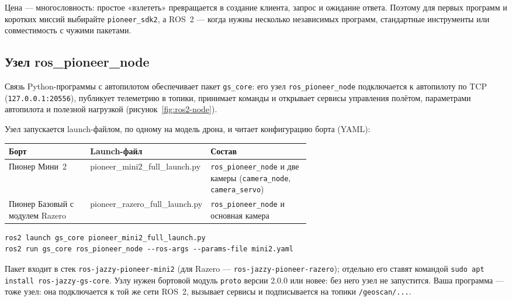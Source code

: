 Цена --- многословность: простое «взлететь» превращается в создание клиента, запрос и ожидание ответа. Поэтому для первых программ и коротких миссий выбирайте \texttt{pioneer\_sdk2}, а ROS~2 --- когда нужны несколько независимых программ, стандартные инструменты или совместимость с чужими пакетами.

\subsection{Узел ros\_pioneer\_node}

Связь Python-программы с автопилотом обеспечивает пакет \texttt{gs\_core}: его узел \texttt{ros\_pioneer\_node} подключается к автопилоту по TCP (\texttt{127.0.0.1:20556}), публикует телеметрию в топики, принимает команды и открывает сервисы управления полётом, параметрами автопилота и полезной нагрузкой (рисунок~\ref{fig:ros2-node}).



Узел запускается launch-файлом, по одному на модель дрона, и читает конфигурацию борта (YAML):

\begin{center}
\small
\begin{tabularx}{\linewidth}{@{}>{\raggedright\arraybackslash}p{0.27\linewidth} >{\ttfamily\raggedright\arraybackslash}p{0.33\linewidth} X@{}}
\toprule
\textrm{\textbf{Борт}} & \textrm{\textbf{Launch-файл}} & \textrm{\textbf{Состав}} \\
\midrule
\textrm{Пионер Мини~2} & pioneer\_mini2\_\allowbreak full\_launch.py & \textrm{\texttt{ros\_pioneer\_node} и две камеры (\texttt{camera\_node}, \texttt{camera\_servo})} \\
\textrm{Пионер Базовый с модулем Razero} & pioneer\_razero\_\allowbreak full\_launch.py & \textrm{\texttt{ros\_pioneer\_node} и основная камера} \\
\bottomrule
\end{tabularx}
\end{center}

\begin{codebox}
\begin{verbatim}
ros2 launch gs_core pioneer_mini2_full_launch.py
ros2 run gs_core ros_pioneer_node --ros-args --params-file mini2.yaml
\end{verbatim}
\end{codebox}

Пакет входит в стек \texttt{ros-jazzy-pioneer-mini2} (для Razero --- \texttt{ros-jazzy-pioneer-razero}); отдельно его ставят командой \verb|sudo apt install ros-jazzy-gs-core|. Узлу нужен бортовой модуль \texttt{proto} версии 2.0.0 или новее: без него узел не запустится. Ваша программа --- тоже узел: она подключается к той же сети ROS~2, вызывает сервисы и подписывается на топики \texttt{/geoscan/...}.

